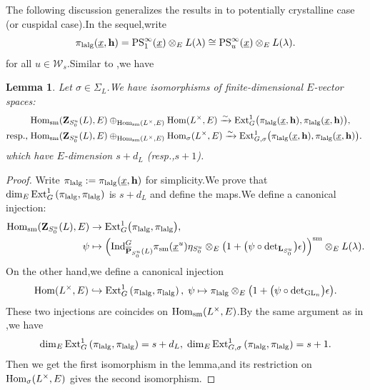 \documentclass[10pt]{article}
\newtheorem{lem}[thm]{Lemma}
\newcommand{\ind}{{\rm Ind}}
\newcommand{\homo}{{\rm Hom}}
\newcommand{\ext}{{\rm Ext}}
\newcommand{\GLN}{{\rm GL}}
\newcommand{\op}{{\overline{{\mathbf{P}}}}}
\newcommand{\sm}{{\rm sm}}
\newcommand{\lalg}{{\rm lalg}}
\newcommand{\bL}{{\mathbf{L}}}
\newcommand{\bZ}{{\mathbf{Z}}}
\newcommand{\bh}{{\mathbf{h}}}
\newcommand{\sW}{\mathscr W}
\begin{document}
The following discussion generalizes the results in  \cite[Section 2.1]{BDcritical25} to potentially crystalline case (or cuspidal case).\;In the sequel,\;write
\[\pi_{\lalg}(\underline{x},\bh)=\mathrm{PS}^{\infty}_{1}(\underline{x})\otimes_E L(\lambda)\cong \mathrm{PS}^{\infty}_{u}(\underline{x})\otimes_E L(\lambda).\]
for all $u\in \sW_s$.\;Similar to \cite[Lemma 2.1.6]{BDcritical25},\;we have
\begin{lem}\label{parameterline} Let $\sigma\in \Sigma_L$.\;We have isomorphisms of finite-dimensional $E$-vector spaces:
	\begin{equation}
		\begin{aligned}
			&\homo_{\sm}(\bZ_{S^{u}_0}(L),E)\oplus_{\homo_{\sm}(L^{\times},E)}\homo(L^{\times},E)\xrightarrow{\sim} \ext^1_{G}\big(\pi_{\lalg}(\underline{x},\bh),\pi_{\lalg}(\underline{x},\bh)\big),\\
\text{resp.,\;}	&\homo_{\sm}(\bZ_{S^{u}_0}(L),E)\oplus_{\homo_{\sm}(L^{\times},E)}\homo_{\sigma}(L^{\times},E)\xrightarrow{\sim} \ext^1_{G,\sigma}\big(\pi_{\lalg}(\underline{x},\bh),\pi_{\lalg}(\underline{x},\bh)\big).\;
		\end{aligned}
	\end{equation}
which have $E$-dimension $s+d_L$ (resp.,\;$s+1$).\;
\end{lem}
\begin{proof}Write $\pi_{\lalg}:=\pi_{\lalg}(\underline{x},\bh)$ for simplicity.\;We prove that $\dim_E\ext^1_{G}\left(\pi_{\lalg},\pi_{\lalg}\right)$ is $s+d_L$ and define the maps.\;We define a canonical injection:
	\begin{equation}\label{lalginj1}
		\begin{aligned}
			\homo_{\sm}(\bZ_{S^u_0}(L),E)&\rightarrow\ext^1_{G}\big(\pi_{\lalg},\pi_{\lalg}\big),\;\\
			\psi&\mapsto \Big(\ind^G_{\op_{S_0^u}(L)}\pi_{\sm}(\underline{x}^u)\eta_{S_0^u}\otimes_E\big(1+\big(\psi\circ\mathrm{det}_{\bL_{S_0^u}}\big)\epsilon\big)\Big)^{\mathrm{sm}}\otimes_EL(\lambda).
		\end{aligned}
	\end{equation}
On the other hand,\;we define a canonical injection
\[\homo(L^{\times},E)\hookrightarrow \ext^1_{G}\left(\pi_{\lalg},\pi_{\lalg}\right),\;\psi\mapsto \pi_{\lalg}\otimes_E\big(1+\big(\psi\circ\mathrm{det}_{\GLN_n}\big)\epsilon\big).\]
These two injections are coincides on $\homo_{\mathrm{sm}}(L^{\times},E)$.\;By the same argument as in \cite[Lemma 3.16]{HigherLinvariantsGL3(Qp)},\;we have
\[\dim_E\ext^1_{G}\left(\pi_{\lalg},\pi_{\lalg}\right)=s+d_L,\;\dim_E\ext^1_{G,\sigma}\left(\pi_{\lalg},\pi_{\lalg}\right)=s+1.\]
Then we get the first isomorphism in the lemma,\;and its restriction on $\homo_{\sigma}(L^{\times},E)$ gives the second isomorphism.\;
\end{proof}
\end{document}
